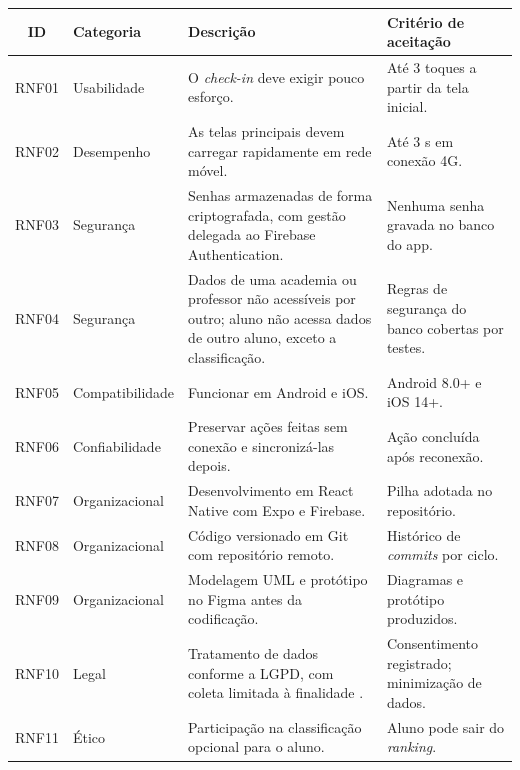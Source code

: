 \begin{quadro}[!htb]
  \caption{Requisitos não funcionais}
  \label{qua:rnf}
  \centering
  \footnotesize
  \begin{tabular}{|c|p{2.3cm}|p{7.0cm}|p{3.6cm}|}
    \hline
    \textbf{ID} & \textbf{Categoria} & \textbf{Descrição} & \textbf{Critério de aceitação} \\ \hline
    RNF01 & Usabilidade & O \textit{check-in} deve exigir pouco esforço. & Até 3 toques a partir da tela inicial. \\ \hline
    RNF02 & Desempenho & As telas principais devem carregar rapidamente em rede móvel. & Até 3 s em conexão 4G. \\ \hline
    RNF03 & Segurança & Senhas armazenadas de forma criptografada, com gestão delegada ao Firebase Authentication. & Nenhuma senha gravada no banco do app. \\ \hline
    RNF04 & Segurança & Dados de uma academia ou professor não acessíveis por outro; aluno não acessa dados de outro aluno, exceto a classificação. & Regras de segurança do banco cobertas por testes. \\ \hline
    RNF05 & Compatibilidade & Funcionar em Android e iOS. & Android 8.0+ e iOS 14+. \\ \hline
    RNF06 & Confiabilidade & Preservar ações feitas sem conexão e sincronizá-las depois. & Ação concluída após reconexão. \\ \hline
    RNF07 & Organizacional & Desenvolvimento em React Native com Expo e Firebase. & Pilha adotada no repositório. \\ \hline
    RNF08 & Organizacional & Código versionado em Git com repositório remoto. & Histórico de \textit{commits} por ciclo. \\ \hline
    RNF09 & Organizacional & Modelagem UML e protótipo no Figma antes da codificação. & Diagramas e protótipo produzidos. \\ \hline
    RNF10 & Legal & Tratamento de dados conforme a LGPD, com coleta limitada à finalidade \cite{lgpd2018}. & Consentimento registrado; minimização de dados. \\ \hline
    RNF11 & Ético & Participação na classificação opcional para o aluno. & Aluno pode sair do \textit{ranking}. \\ \hline
  \end{tabular}
\end{quadro}

